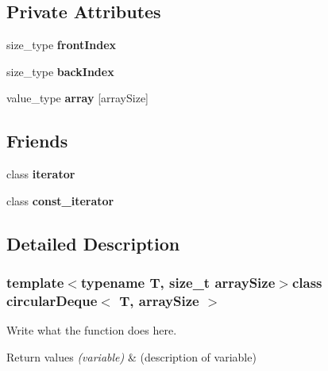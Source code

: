 \subsection*{Private Attributes}
\begin{DoxyCompactItemize}
\item 
\hypertarget{classcircularDeque_af64b4fbb5045a74a52c9d088c01111bf}{size\+\_\+type {\bfseries front\+Index}}\label{classcircularDeque_af64b4fbb5045a74a52c9d088c01111bf}

\item 
\hypertarget{classcircularDeque_adb67745fe0b548b805863c34762f27e2}{size\+\_\+type {\bfseries back\+Index}}\label{classcircularDeque_adb67745fe0b548b805863c34762f27e2}

\item 
\hypertarget{classcircularDeque_a554afa6a60a471cd9f6be80ca6605590}{value\+\_\+type {\bfseries array} \mbox{[}array\+Size\mbox{]}}\label{classcircularDeque_a554afa6a60a471cd9f6be80ca6605590}

\end{DoxyCompactItemize}
\subsection*{Friends}
\begin{DoxyCompactItemize}
\item 
\hypertarget{classcircularDeque_a67171474c4da6cc8efe0c7fafefd2b2d}{class {\bfseries iterator}}\label{classcircularDeque_a67171474c4da6cc8efe0c7fafefd2b2d}

\item 
\hypertarget{classcircularDeque_ac220ce1c155db1ac44146c12d178056f}{class {\bfseries const\+\_\+iterator}}\label{classcircularDeque_ac220ce1c155db1ac44146c12d178056f}

\end{DoxyCompactItemize}


\subsection{Detailed Description}
\subsubsection*{template$<$typename T, size\+\_\+t array\+Size$>$class circular\+Deque$<$ T, array\+Size $>$}

Write what the function does here. 


\begin{DoxyRetVals}{Return values}
{\em (variable)} & (description of variable) \\
\hline
\end{DoxyRetVals}


